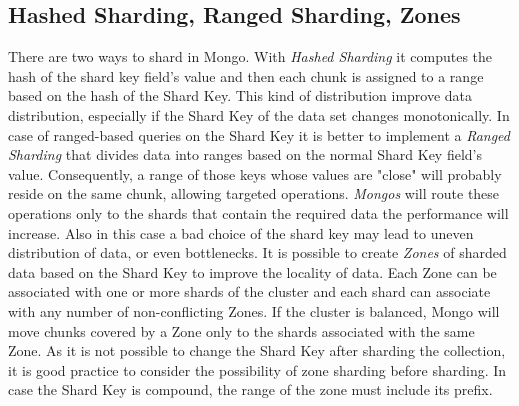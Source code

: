 \subsection{Hashed Sharding, Ranged Sharding, Zones}
There are two ways to shard in Mongo. With \textit{Hashed Sharding} it computes the hash of the shard key field's value and then each chunk is assigned to a range based on the hash of the Shard Key. This kind of distribution improve data distribution, especially if the Shard Key of the data set changes monotonically.
In case of ranged-based queries on the Shard Key it is better to implement a \textit{Ranged Sharding} that divides data into ranges based on the normal Shard Key field's value. Consequently, a range of those keys whose values are "close" will probably reside on the same chunk, allowing targeted operations. \textit{Mongos} will route these operations only to the shards that contain the required data the performance will increase.
Also in this case a bad choice of the shard key may lead to uneven distribution of data, or even bottlenecks.
It is possible to create \textit{Zones} of sharded data based on the Shard Key to improve the locality of data. Each Zone can be associated with one or more shards of the cluster and each shard can associate with any number of non-conflicting Zones.
If the cluster is balanced, Mongo will move chunks covered by a Zone only to the shards associated with the same Zone. As it is not possible to change the Shard Key after sharding the collection, it is good practice to consider the possibility of zone sharding before sharding. In case the Shard Key is compound, the range of the zone must include its prefix.






